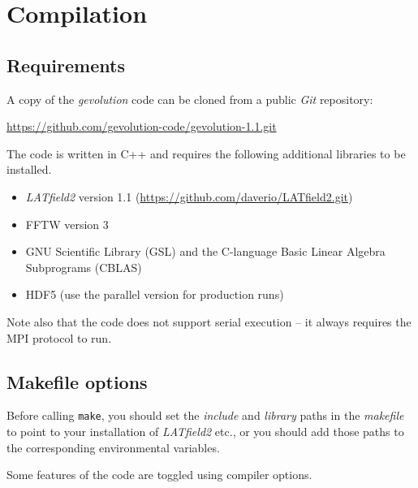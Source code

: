 \documentclass[a4paper,10pt]{article}
\begin{document}
\section{Compilation}

\subsection{Requirements}

A copy of the \textit{gevolution} code can be cloned from a public \textit{Git} repository:

\url{https://github.com/gevolution-code/gevolution-1.1.git}

\noindent The code is written in C++ and requires the following additional libraries to be installed.

\begin{itemize}
 \item \textit{LATfield2} version 1.1 (\url{https://github.com/daverio/LATfield2.git})
 \item FFTW version 3
 \item GNU Scientific Library (GSL) and the C-language Basic Linear Algebra Subprograms (CBLAS)
 \item HDF5 (use the parallel version for production runs)
\end{itemize}

\noindent Note also that the code does not support serial execution -- it always requires the MPI protocol to run.

\subsection{Makefile options}

Before calling \texttt{make}, you should set the \textit{include} and \textit{library} paths in the \textit{makefile} to point to your installation of \textit{LATfield2} etc., or you should add those paths to the corresponding environmental variables.

Some features of the code are toggled using compiler options.
\end{document}
